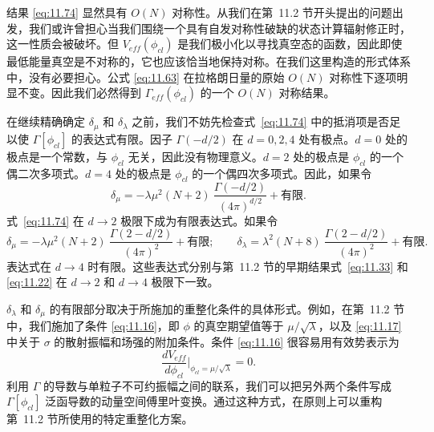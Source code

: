 结果 \eqref{eq:11.74} 显然具有 $O(N)$ 对称性。从我们在第~11.2 节开头提出的问题出发，我们或许曾担心当我们围绕一个具有自发对称性破缺的状态计算辐射修正时，这一性质会被破坏。但 $V_{eff}(\phi_{cl})$ 是我们极小化以寻找真空态的函数，因此即使最低能量真空是不对称的，它也应该恰当地保持对称。在我们这里构造的形式体系中，没有必要担心。公式 \eqref{eq:11.63} 在拉格朗日量的原始 $O(N)$ 对称性下逐项明显不变。因此我们必然得到 $\Gamma_{eff}(\phi_{cl})$ 的一个 $O(N)$ 对称结果。

在继续精确确定 $\delta_\mu$ 和 $\delta_\lambda$ 之前，我们不妨先检查式~\eqref{eq:11.74} 中的抵消项是否足以使 $\Gamma[\phi_{cl}]$ 的表达式有限。因子 $\Gamma(-d/2)$ 在 $d = 0, 2, 4$ 处有极点。$d = 0$ 处的极点是一个常数，与 $\phi_{cl}$ 无关，因此没有物理意义。$d = 2$ 处的极点是 $\phi_{cl}$ 的一个偶二次多项式。$d = 4$ 处的极点是 $\phi_{cl}$ 的一个偶四次多项式。因此，如果令
\begin{equation}
  \delta_\mu = -\lambda\mu^2(N+2)\ \frac{\Gamma(-d/2)}{(4\pi)^{d/2}}
    + \text{有限} .
\end{equation}
式~\eqref{eq:11.74} 在 $d\to 2$ 极限下成为有限表达式。如果令
\begin{equation}
  \delta_\mu = -\lambda\mu^2(N+2)\ \frac{\Gamma(2-d/2)}{(4\pi)^2}
    + \text{有限};\qquad
  \delta_\lambda = \lambda^2(N+8)\ \frac{\Gamma(2-d/2)}{(4\pi)^2}
    + \text{有限} .
  \label{eq:11.76}
\end{equation}
表达式在 $d\to 4$ 时有限。这些表达式分别与第~11.2 节的早期结果式~\eqref{eq:11.33} 和 \eqref{eq:11.22} 在 $d\to 2$ 和 $d\to 4$ 极限下一致。

$\delta_\lambda$ 和 $\delta_\mu$ 的有限部分取决于所施加的重整化条件的具体形式。例如，在第~11.2 节中，我们施加了条件 \eqref{eq:11.16}，即 $\phi$ 的真空期望值等于 $\mu/\sqrt{\lambda}$，以及 \eqref{eq:11.17} 中关于 $\sigma$ 的散射振幅和场强的附加条件。条件 \eqref{eq:11.16} 很容易用有效势表示为
\begin{equation}
  \frac{dV_{eff}}{d\phi_{cl}}\Big|_{\phi_{cl} = \mu/\sqrt{\lambda}} = 0 .
\end{equation}
利用 $\Gamma$ 的导数与单粒子不可约振幅之间的联系，我们可以把另外两个条件写成 $\Gamma[\phi_{cl}]$ 泛函导数的动量空间傅里叶变换。通过这种方式，在原则上可以重构第~11.2 节所使用的特定重整化方案。


